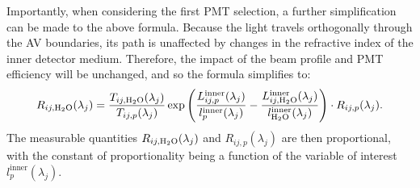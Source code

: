 Importantly, when considering the first PMT selection, a further simplification can be made to the above formula. Because the light travels orthogonally through the AV boundaries, its path is unaffected by changes in the refractive index of the inner detector medium. Therefore, the impact of the beam profile and PMT efficiency will be unchanged, and so the formula simplifies to:
\begin{equation}\label{eq:smellie_ext_length_rsrw_formula_1PMT}
    R_{ij,\ce{H_{2}O}}(\lambda_{j}) = 
    \frac{T_{ij,\ce{H_{2}O}}(\lambda_{j})}{T_{ij,p}(\lambda_{j})}
    \exp\left(
        \frac{L_{ij,p}^{\mathrm{inner}}(\lambda_{j})}{l_{p}^{\mathrm{inner}}(\lambda_{j})}
        -\frac{L_{ij,\ce{H_{2}O}}^{\mathrm{inner}}(\lambda_{j})}{l_{\ce{H_{2}O}}^{\mathrm{inner}}(\lambda_{j})}
    \right)
    \cdot  R_{ij,p}(\lambda_{j}).
\end{equation}
The measurable quantities $R_{ij,\ce{H_{2}O}}(\lambda_{j})$ and $R_{ij,p}(\lambda_{j})$ are then proportional, with the constant of proportionality being a function of the variable of interest $l_{p}^{\mathrm{inner}}(\lambda_{j})$.


